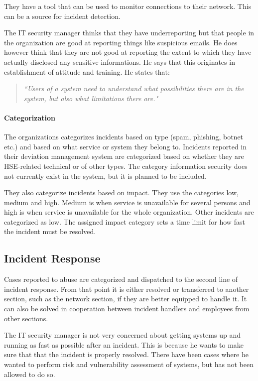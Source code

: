 They have a tool that can be used to monitor connections to their network. This can be a source for incident detection.

The IT security manager thinks that they have underreporting but that people in the organization are good at reporting things like suspicious emails. He does however think that they are not good at reporting the extent to which they have actually disclosed any sensitive informations. He says that this originates in establishment of attitude and training. He states that:

\begin{quote}
\textit{``Users of a system need to understand what possibilities there are in the system, but also what limitations there are."} 
\end{quote}

\paragraph{Categorization}
The organizations categorizes incidents based on type (spam, phishing, botnet etc.) and based on what service or system they belong to. Incidents reported in their deviation management system are categorized based on whether they are \ac{HSE}-related technical or of other types. The category information security does not currently exist in the system, but it is planned to be included.

They also categorize incidents based on impact. They use the categories low, medium and high. Medium is when service is unavailable for several persons and high is when service is unavailable for the whole organization. Other incidents are categorized as low. The assigned impact category sets a time limit for how fast the incident must be resolved.

\subsection{Incident Response}
Cases reported to abuse are categorized and dispatched to the second line of incident response. %
From that point it is either resolved or transferred to another section, such as the network section, if they are better equipped to handle it. It can also be solved in cooperation between incident handlers and employees from other sections.

The IT security manager is not very concerned about getting systems up and running as fast as possible after an incident. This is because he wants to make sure that that the incident is properly resolved. There have been cases where he wanted to perform risk and vulnerability assessment of systems, but has not been allowed to do so.

